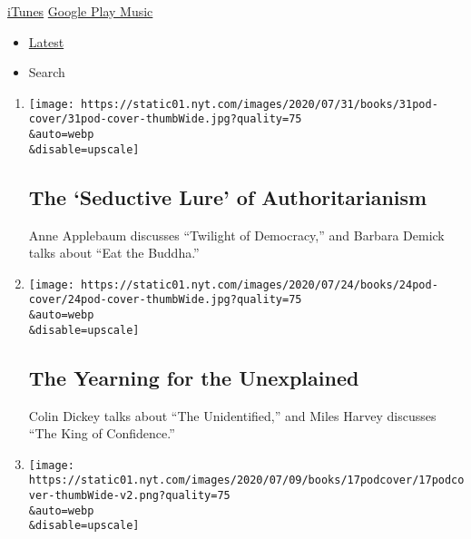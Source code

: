 \href{https://itunes.apple.com/us/podcast/book-review/id120315179?mt=2}{iTunes}
\textbar{}
\href{https://play.google.com/music/listen?u=0\#/ps/Iv6zeb5qwjtzjfbyo3vy5zny5ky}{Google
Play Music}

\begin{itemize}
\tightlist
\item
  \protect\hyperlink{stream-panel}{Latest}
\item
  Search
\end{itemize}

\begin{enumerate}
\def\labelenumi{\arabic{enumi}.}
\item
  \href{/2020/07/31/books/review/podcast-twilight-democracy-anne-applebaum-eat-buddha-barbara-demick.html}{}

  \texttt{[image: https://static01.nyt.com/images/2020/07/31/books/31pod-cover/31pod-cover-thumbWide.jpg?quality=75\\\&auto=webp\\\&disable=upscale]}

  \hypertarget{the-seductive-lure-of-authoritarianism}{%
  \subsection{The `Seductive Lure' of
  Authoritarianism}\label{the-seductive-lure-of-authoritarianism}}

  Anne Applebaum discusses ``Twilight of Democracy,'' and Barbara Demick
  talks about ``Eat the Buddha.''
\item
  \href{/2020/07/24/books/review/podcast-colin-dickey-unexplained-miles-harvey-king-of-confidence.html}{}

  \texttt{[image: https://static01.nyt.com/images/2020/07/24/books/24pod-cover/24pod-cover-thumbWide.jpg?quality=75\\\&auto=webp\\\&disable=upscale]}

  \hypertarget{the-yearning-for-the-unexplained}{%
  \subsection{The Yearning for the
  Unexplained}\label{the-yearning-for-the-unexplained}}

  Colin Dickey talks about ``The Unidentified,'' and Miles Harvey
  discusses ``The King of Confidence.''
\item
  \href{/2020/07/17/books/review/podcast-julian-zelizer-burning-down-house-newt-gingrich-notes-silencing-lacy-crawford.html}{}

  \texttt{[image: https://static01.nyt.com/images/2020/07/09/books/17podcover/17podcover-thumbWide-v2.png?quality=75\\\&auto=webp\\\&disable=upscale]}


\end{enumerate}
